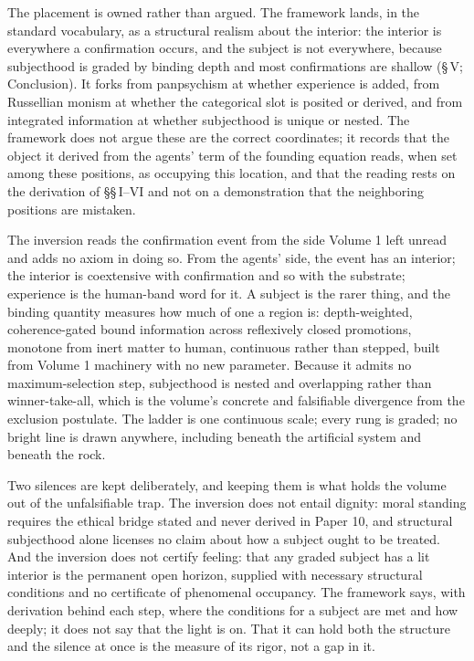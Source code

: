 \documentclass[11pt,oneside]{report}
\theoremstyle{definition}
\theoremstyle{remark}
\begin{document}
The placement is owned rather than argued. The framework lands, in the standard vocabulary, as a structural realism about the interior: the interior is everywhere a confirmation occurs, and the subject is not everywhere, because subjecthood is graded by binding depth and most confirmations are shallow (\S\,V; Conclusion). It forks from panpsychism at whether experience is added, from Russellian monism at whether the categorical slot is posited or derived, and from integrated information at whether subjecthood is unique or nested. The framework does not argue these are the correct coordinates; it records that the object it derived from the agents' term of the founding equation reads, when set among these positions, as occupying this location, and that the reading rests on the derivation of \S\S\,I--VI and not on a demonstration that the neighboring positions are mistaken.



The inversion reads the confirmation event from the side Volume 1 left
unread and adds no axiom in doing so. From the agents' side, the event
has an interior; the interior is coextensive with confirmation and so
with the substrate; experience is the human-band word for it. A subject
is the rarer thing, and the binding quantity measures how much of one a
region is: depth-weighted, coherence-gated bound information across
reflexively closed promotions, monotone from inert matter to human,
continuous rather than stepped, built from Volume 1 machinery with no new
parameter. Because it admits no maximum-selection step, subjecthood is
nested and overlapping rather than winner-take-all, which is the volume's
concrete and falsifiable divergence from the exclusion postulate. The
ladder is one continuous scale; every rung is graded; no bright line is
drawn anywhere, including beneath the artificial system and beneath the
rock.

Two silences are kept deliberately, and keeping them is what holds the
volume out of the unfalsifiable trap. The inversion does not entail
dignity: moral standing requires the ethical bridge stated and never
derived in Paper 10, and structural subjecthood alone licenses no claim
about how a subject ought to be treated. And the inversion does not
certify feeling: that any graded subject has a lit interior is the
permanent open horizon, supplied with necessary structural conditions and
no certificate of phenomenal occupancy. The framework says, with
derivation behind each step, where the conditions for a subject are met
and how deeply; it does not say that the light is on. That it can hold
both the structure and the silence at once is the measure of its rigor,
not a gap in it.
\end{document}

